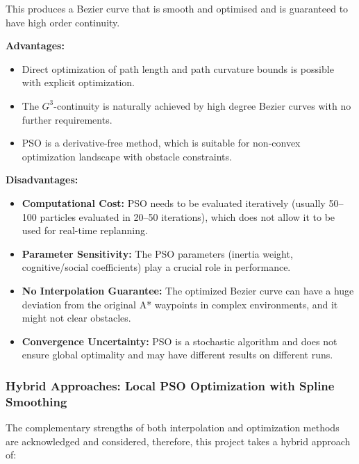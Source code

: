 This produces a Bezier curve that is smooth and optimised and is guaranteed to have high order continuity.

\textbf{Advantages:}

\begin{itemize}[noitemsep]
\item Direct optimization of path length and path curvature bounds is possible with explicit optimization.
\item The $G^3$-continuity is naturally achieved by high degree Bezier curves with no further requirements.
\item PSO is a derivative-free method, which is suitable for non-convex optimization landscape with obstacle constraints.

\end{itemize}

\textbf{Disadvantages:}

\begin{itemize}[noitemsep]
\item \textbf{Computational Cost:} PSO needs to be evaluated iteratively (usually 50–100 particles evaluated in 20–50 iterations), which does not allow it to be used for real-time replanning.

\item \textbf{Parameter Sensitivity:} The PSO parameters (inertia weight, cognitive/social coefficients) play a crucial role in performance.

\item \textbf{No Interpolation Guarantee:} The optimized Bezier curve can have a huge deviation from the original A* waypoints in complex environments, and it might not clear obstacles.

\item \textbf{Convergence Uncertainty:} PSO is a stochastic algorithm and does not ensure global optimality and may have different results on different runs.
\end{itemize}

\subsubsection{Hybrid Approaches: Local PSO Optimization with Spline Smoothing}

The complementary strengths of both interpolation and optimization methods are acknowledged and considered, therefore, this project takes a hybrid approach of:

